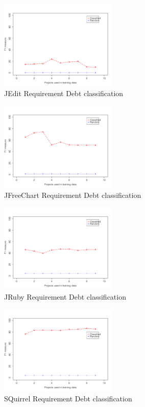 \begin{figure}[thb!]
  \centering
  \includegraphics[width=0.50\textwidth]{figures/implementation_jedit.pdf}
  \vspace{-3mm}
  \caption{JEdit Requirement Debt classification}
  \label{fig:implementation_jedit}
\end{figure}

\begin{figure}[thb!]
  \centering
  \includegraphics[width=0.50\textwidth]{figures/implementation_jfreechart.pdf}
  \vspace{-3mm}
  \caption{JFreeChart Requirement Debt classification}
  \label{fig:implementation_jfreechart}
\end{figure}

\begin{figure}[thb!]
  \centering
  \includegraphics[width=0.50\textwidth]{figures/implementation_jruby.pdf}
  \vspace{-3mm}
  \caption{JRuby Requirement Debt classification}
  \label{fig:implementation_jruby}
\end{figure}

\begin{figure}[thb!]
  \centering
  \includegraphics[width=0.50\textwidth]{figures/implementation_sql.pdf}
  \vspace{-3mm}
  \caption{SQuirrel Requirement Debt classification}
  \label{fig:implementation_sql}
\end{figure}

\clearpage
